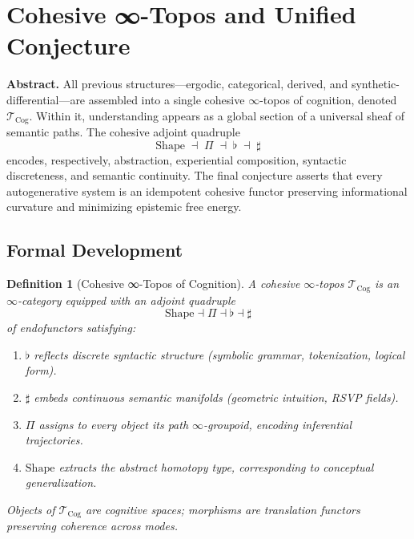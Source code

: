 \documentclass[12pt,a4paper,twoside,openright]{book}
\newtheorem{definition}[theorem]{Definition}
\begin{document}

\section{Cohesive ∞-Topos and Unified Conjecture}
\label{sec:cohesivetopos}

\textbf{Abstract.}
All previous structures—ergodic, categorical, derived, and synthetic-differential—are assembled into a single cohesive
$\infty$-topos of cognition, denoted $\mathcal{T}_{\mathrm{Cog}}$.
Within it, understanding appears as a global section of a universal sheaf of semantic paths.
The cohesive adjoint quadruple
\[
\text{Shape}\;\dashv\;\Pi\;\dashv\;\flat\;\dashv\;\sharp
\]
encodes, respectively, abstraction, experiential composition,
syntactic discreteness, and semantic continuity.
The final conjecture asserts that every autogenerative system is an idempotent cohesive functor
preserving informational curvature and minimizing epistemic free energy.

\subsection*{Formal Development}

\begin{definition}[Cohesive ∞-Topos of Cognition]
A cohesive $\infty$-topos
\(
\mathcal{T}_{\mathrm{Cog}}
\)
is an $\infty$-category equipped with an adjoint quadruple
\[
\mathrm{Shape}\dashv \Pi\dashv\flat\dashv\sharp
\]
of endofunctors satisfying:

\begin{enumerate}
\item $\flat$ reflects discrete syntactic structure
   (symbolic grammar, tokenization, logical form).
\item $\sharp$ embeds continuous semantic manifolds
   (geometric intuition, RSVP fields).
\item $\Pi$ assigns to every object its path $\infty$-groupoid,
   encoding inferential trajectories.
\item $\mathrm{Shape}$ extracts the abstract homotopy type,
   corresponding to conceptual generalization.
\end{enumerate}

Objects of $\mathcal{T}_{\mathrm{Cog}}$ are \emph{cognitive spaces};
morphisms are \emph{translation functors} preserving coherence across modes.
\end{definition}
\end{document}
